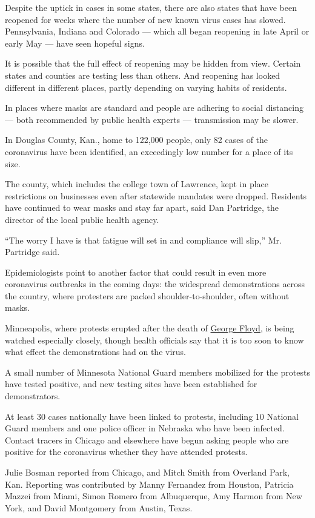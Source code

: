 Despite the uptick in cases in some states, there are also states that
have been reopened for weeks where the number of new known virus cases
has slowed. Pennsylvania, Indiana and Colorado --- which all began
reopening in late April or early May --- have seen hopeful signs.

It is possible that the full effect of reopening may be hidden from
view. Certain states and counties are testing less than others. And
reopening has looked different in different places, partly depending on
varying habits of residents.

In places where masks are standard and people are adhering to social
distancing --- both recommended by public health experts ---
transmission may be slower.

In Douglas County, Kan., home to 122,000 people, only 82 cases of the
coronavirus have been identified, an exceedingly low number for a place
of its size.

The county, which includes the college town of Lawrence, kept in place
restrictions on businesses even after statewide mandates were dropped.
Residents have continued to wear masks and stay far apart, said Dan
Partridge, the director of the local public health agency.

``The worry I have is that fatigue will set in and compliance will
slip,'' Mr. Partridge said.

Epidemiologists point to another factor that could result in even more
coronavirus outbreaks in the coming days: the widespread demonstrations
across the country, where protesters are packed shoulder-to-shoulder,
often without masks.

Minneapolis, where protests erupted after the death of
\href{https://www.nytimes.com/article/george-floyd-who-is.html}{George
Floyd}, is being watched especially closely, though health officials say
that it is too soon to know what effect the demonstrations had on the
virus.

A small number of Minnesota National Guard members mobilized for the
protests have tested positive, and new testing sites have been
established for demonstrators.

At least 30 cases nationally have been linked to protests, including 10
National Guard members and one police officer in Nebraska who have been
infected. Contact tracers in Chicago and elsewhere have begun asking
people who are positive for the coronavirus whether they have attended
protests.

Julie Bosman reported from Chicago, and Mitch Smith from Overland Park,
Kan. Reporting was contributed by Manny Fernandez from Houston, Patricia
Mazzei from Miami, Simon Romero from Albuquerque, Amy Harmon from New
York, and David Montgomery from Austin, Texas.

